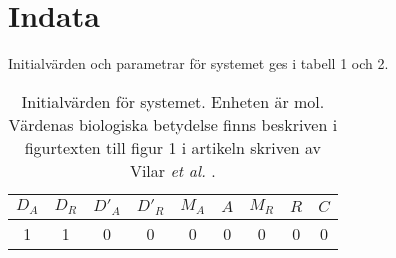 \section{Indata}
\label{sec:indata}

Initialvärden och parametrar för systemet ges i tabell 1 och 2.

\begin{table}[H]
	\centering
	\label{hej}
	\begin{tabular}{ccccccccc}
	  \toprule
		$D_A$ & $D_R$ & $D'_A$ & $D'_R$ & $M_A$ & $A$ & $M_R$ & $R$ &
		$C$ \\
		\midrule
		1 & 1 & 0 & 0 & 0 & 0 & 0 & 0 & 0\\
		\bottomrule
	\end{tabular}
	\caption{Initialvärden för systemet. Enheten är mol. Värdenas biologiska betydelse finns beskriven i figurtexten till figur 1 i artikeln skriven av Vilar \emph{et al.} \cite{ref:rapport}.}
\end{table}

\begin{table}[H]
	\centering
	\caption{Parametrar för systemet. Alla parametrar har enheterna
	  h$^{-1}$ förutom $\gamma$ som har enheten mol$^{-1}$h$^{-1}$. Parametrarnas biologiska betydelse finns beskriven i figurtexten till figur 1 i artikeln skriven av Vilar \emph{et al.} \cite{ref:rapport}.}
\end{table}
